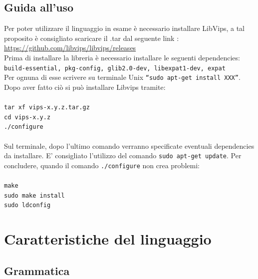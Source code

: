 \documentclass[10pt]{article}
\begin{document}
\subsection{Guida all'uso}
Per poter utilizzare il linguaggio in esame è necessario installare LibVips, a tal proposito è consigliato scaricare il .tar dal seguente link : \url{https://github.com/libvips/libvips/releases}\\
Prima di installare la libreria è necessario installare le seguenti dependencies: \\
\texttt{build-essential, pkg-config, glib2.0-dev, libexpat1-dev, expat}
\\ Per ognuna di esse scrivere su terminale Unix \texttt{“sudo apt-get install XXX”}. Dopo aver fatto ciò si può installare Libvips tramite:\\\\
\texttt{tar xf vips-x.y.z.tar.gz}\\
\texttt{cd vips-x.y.z}\\
\texttt{./configure}\\\\
Sul terminale, dopo l’ultimo comando verranno specificate eventuali dependencies da installare. E' consigliato l'utilizzo del comando \texttt{sudo apt-get update}. Per concludere, quando il comando \texttt{./configure} non crea problemi:\\\\
\texttt{make}\\
\texttt{sudo make install}\\
\texttt{sudo ldconfig}\\
\clearpage
\section{Caratteristiche del linguaggio} 
\subsection{Grammatica}
\end{document}
